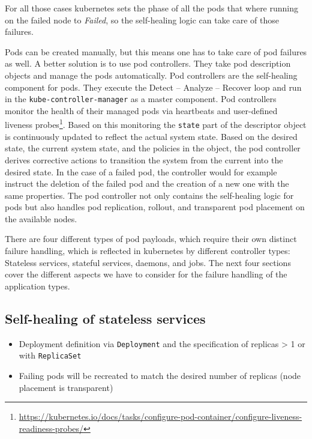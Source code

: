   For all those cases \gls{kubernetes} sets the phase of all the pods that where running on the failed node to \textit{Failed}, so the self-healing logic can take care of those failures.

  Pods can be created manually, but this means one has to take care of pod failures as well.
  A better solution is to use pod controllers.
  They take pod description objects and manage the pods automatically.
  Pod controllers are the self-healing component for pods.
  They execute the Detect -- Analyze -- Recover loop and run in the \texttt{kube-controller-manager} as a master component.
  Pod controllers monitor the health of their managed pods via heartbeats and user-defined liveness probes\footnote{\url{https://kubernetes.io/docs/tasks/configure-pod-container/configure-liveness-readiness-probes/}}.
  Based on this monitoring the \texttt{state} part of the descriptor object is continuously updated to reflect the actual system state.
  Based on the desired state, the current system state, and the policies in the object, the pod controller derives corrective actions to transition the system from the current into the desired state.
  In the case of a failed pod, the controller would for example instruct the deletion of the failed pod and the creation of a new one with the same properties.
  The pod controller not only contains the self-healing logic for pods but also handles pod replication, rollout, and transparent pod placement on the available nodes.

  There are four different types of pod payloads, which require their own distinct failure handling, which is reflected in \gls{kubernetes} by different controller types:
  Stateless services, stateful services, daemons, and jobs.
  The next four sections cover the different aspects we have to consider for the failure handling of the application types.

  \subsection{Self-healing of stateless services}
    \begin{itemize}
      \item Deployment definition via \texttt{Deployment} and the specification of replicas > 1 or with \texttt{ReplicaSet}
      \item Failing pods will be recreated to match the desired number of replicas (node placement is transparent)
    \end{itemize}


